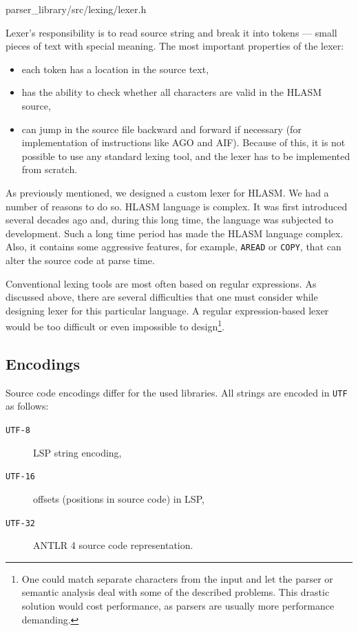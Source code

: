 {parser\_library/src/lexing/lexer.h}

Lexer's responsibility is to read source string and break it into tokens --- small pieces of text with special meaning. The most important properties of the lexer:
\begin{itemize}
	\item each token has a location in the source text,
	\item has the ability to check whether all characters are valid in the HLASM source,
	\item can jump in the source file backward and forward if necessary (for implementation of instructions like AGO and AIF). Because of this, it is not possible to use any standard lexing tool, and the lexer has to be implemented from scratch.
\end{itemize}

As previously mentioned, we designed a custom lexer for HLASM. We had a number of reasons to do so. HLASM language is complex. It was first introduced several decades ago and, during this long time, the language was subjected to development. Such a long time period has made the HLASM language complex. Also, it contains some aggressive features, for example, \texttt{AREAD} or \texttt{COPY}, that can alter the source code at parse time.

Conventional lexing tools are most often based on regular expressions. As discussed above, there are several difficulties that one must consider while designing lexer for this particular language. A regular expression-based lexer would be too difficult or even impossible to design\footnote{One could match separate characters from the input and let the parser or semantic analysis deal with some of the described problems. This drastic solution would cost performance, as parsers are usually more performance demanding.}.

\subsection{Encodings}
Source code encodings differ for the used libraries. All strings are encoded in \texttt{UTF} as follows:

\begin{description}
	\item[\texttt{UTF-8}] LSP string encoding,
	\item[\texttt{UTF-16}] offsets (positions in source code) in LSP,
	\item[\texttt{UTF-32}] ANTLR 4 source code representation.
\end{description}


